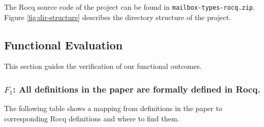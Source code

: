 The Rocq source code of the project can be found in \lstinline|mailbox-types-rocq.zip|.
Figure \ref{fig:dir-structure} describes the directory structure of the project.

\subsection{Functional Evaluation}
This section guides the verification of our functional outcomes.

\subsubsection{$F_1$: All definitions in the paper are formally defined in Rocq.}
The following table shows a mapping from definitions in the paper to corresponding Rocq definitions and where to find them.
\pagebreak
\small
